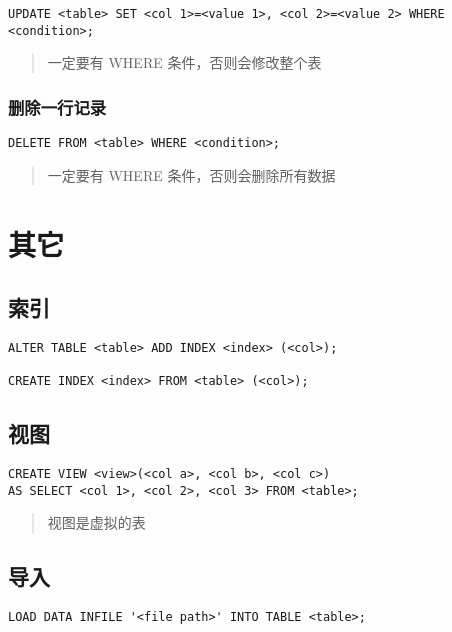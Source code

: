 \documentclass[a4paper, twoside]{article}
\begin{document}
\begin{verbatim}
UPDATE <table> SET <col 1>=<value 1>, <col 2>=<value 2> WHERE <condition>;
\end{verbatim}

\begin{quote}
一定要有 WHERE 条件，否则会修改整个表
\end{quote}

\subsubsection{删除一行记录}

\begin{verbatim}
DELETE FROM <table> WHERE <condition>;
\end{verbatim}

\begin{quote}
一定要有 WHERE 条件，否则会删除所有数据
\end{quote}

\section{其它}

\subsection{索引}

\begin{verbatim}
ALTER TABLE <table> ADD INDEX <index> (<col>);

CREATE INDEX <index> FROM <table> (<col>);
\end{verbatim}

\subsection{视图}

\begin{verbatim}
CREATE VIEW <view>(<col a>, <col b>, <col c>)
AS SELECT <col 1>, <col 2>, <col 3> FROM <table>;
\end{verbatim}

\begin{quote}
视图是虚拟的表
\end{quote}

\subsection{导入}

\begin{verbatim}
LOAD DATA INFILE '<file path>' INTO TABLE <table>;
\end{verbatim}
\end{document}
